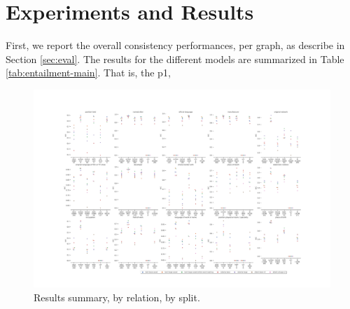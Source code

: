 \section{Experiments and Results}
\label{sec:experiments}

First, we report the overall consistency performances, per graph, as describe in Section \ref{sec:eval}.
The results for the different models are summarized in Table \ref{tab:entailment-main}.
That is, the p1, 









\begin{figure}[t!]
\centering

\includegraphics[width=1.\textwidth]{figures/results}

\caption{Results summary, by relation, by split.}
\label{fig:resuls}
\end{figure}